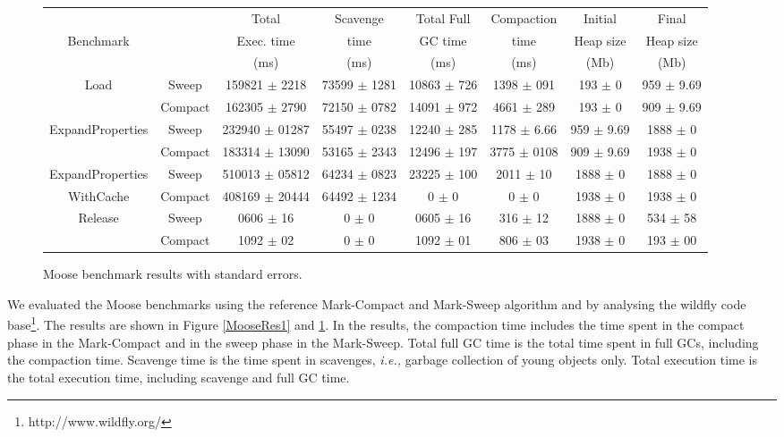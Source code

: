 \documentclass[10pt, sigplan]{acmart}
\begin{document}
\begin{figure}[thb]
\begin{tabular}{|c|c|c|c|c|c|c|c|}
   \hline
  & & Total   & Scavenge  & Total Full  & Compaction  & Initial  & Final \\
 Benchmark & &  Exec. time &  time & GC time &  time &  Heap size & Heap size \\
  & &  (ms) &  (ms) & (ms) &  (ms) &  (Mb) &  (Mb) \\
   \hline
   \multirow{2}{*}{Load} & Sweep 	& 159821 $\pm$ 2218 &	73599 $\pm$ 1281 	& 10863 $\pm$ 726 	&1398 $\pm$ 091 	& 193 $\pm$ 0 	& 959 $\pm$ 9.69 \\
    				    & Compact 	& 162305 $\pm$ 2790 &	72150 $\pm$ 0782 	& 14091 $\pm$ 972 	&4661 $\pm$ 289 	& 193 $\pm$ 0 	& 909 $\pm$ 9.69 \\
   \hline
   \multirow{2}{*}{ExpandProperties} 	& Sweep 		& 232940 $\pm$ 01287 &	55497 $\pm$ 0238 	& 12240 $\pm$ 285 	&1178 $\pm$ 6.66 	& 959 $\pm$ 9.69 & 1888 $\pm$ 0 \\
    				    			& Compact 	& 183314 $\pm$ 13090 &	53165 $\pm$ 2343 	& 12496 $\pm$ 197 	&3775 $\pm$ 0108 	& 909 $\pm$ 9.69 & 1938 $\pm$ 0 \\
   \hline
   ExpandProperties 		& Sweep 		& 510013 $\pm$ 05812 &	64234 $\pm$ 0823 	& 23225 $\pm$ 100 	&2011 $\pm$ 10 	& 1888 $\pm$ 0 	& 1888 $\pm$ 0 \\
   WithCache  			& Compact 	& 408169 $\pm$ 20444 &	64492 $\pm$ 1234 	& 0 $\pm$ 0 		&0 $\pm$ 0 		& 1938 $\pm$ 0 		& 1938 $\pm$ 0 \\
   \hline
   \multirow{2}{*}{Release} 	& Sweep 		& 0606 $\pm$ 16 		&	0 $\pm$ 0 	& 0605 $\pm$ 16 	&316 $\pm$ 12 		& 1888 $\pm$ 0 	& 534 $\pm$ 58 \\
    				    		& Compact 	& 1092 $\pm$ 02 	&	0 $\pm$ 0 	& 1092 $\pm$ 01 		&806 $\pm$ 03 			& 1938 $\pm$ 0 		& 193 $\pm$ 00 \\
   \hline
\end{tabular} 
\caption{Moose benchmark results with standard errors.}
\label{MooseRes2}
\end{figure}

We evaluated the Moose benchmarks using the reference Mark-Compact and Mark-Sweep algorithm and by analysing the wildfly code base\footnote{http://www.wildfly.org/}. The results are shown in Figure \ref{MooseRes1} and \ref{MooseRes2}. In the results, the compaction time includes the time spent in the compact phase in the Mark-Compact and in the sweep phase in the Mark-Sweep. Total full GC time is the total time spent in full GCs, including the compaction time. Scavenge time is the time spent in scavenges, \emph{i.e.,} garbage collection of young objects only. Total execution time is the total execution time, including scavenge and full GC time.
\end{document}
